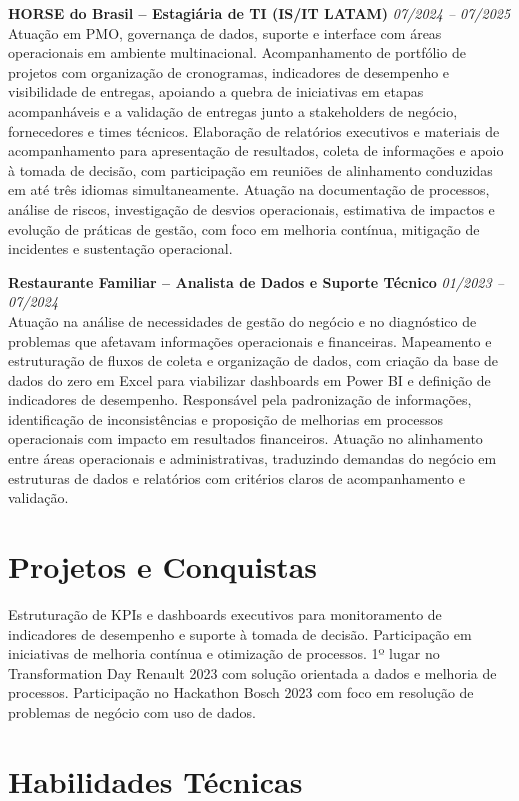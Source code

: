 \documentclass[11pt,a4paper]{article}
\newcommand{\experience}[3]{%
  \textbf{#1} \hfill \textit{#2}\\[4pt]
  #3
  \vspace{8pt}
}
\begin{document}
\experience{HORSE do Brasil -- Estagiária de TI (IS/IT LATAM)}{07/2024 -- 07/2025}{%
Atuação em PMO, governança de dados, suporte e interface com áreas operacionais em ambiente multinacional. Acompanhamento de portfólio de projetos com organização de cronogramas, indicadores de desempenho e visibilidade de entregas, apoiando a quebra de iniciativas em etapas acompanháveis e a validação de entregas junto a stakeholders de negócio, fornecedores e times técnicos. Elaboração de relatórios executivos e materiais de acompanhamento para apresentação de resultados, coleta de informações e apoio à tomada de decisão, com participação em reuniões de alinhamento conduzidas em até três idiomas simultaneamente. Atuação na documentação de processos, análise de riscos, investigação de desvios operacionais, estimativa de impactos e evolução de práticas de gestão, com foco em melhoria contínua, mitigação de incidentes e sustentação operacional.}

\experience{Restaurante Familiar -- Analista de Dados e Suporte Técnico}{01/2023 -- 07/2024}{%
Atuação na análise de necessidades de gestão do negócio e no diagnóstico de problemas que afetavam informações operacionais e financeiras. Mapeamento e estruturação de fluxos de coleta e organização de dados, com criação da base de dados do zero em Excel para viabilizar dashboards em Power BI e definição de indicadores de desempenho. Responsável pela padronização de informações, identificação de inconsistências e proposição de melhorias em processos operacionais com impacto em resultados financeiros. Atuação no alinhamento entre áreas operacionais e administrativas, traduzindo demandas do negócio em estruturas de dados e relatórios com critérios claros de acompanhamento e validação.}

\section*{Projetos e Conquistas}

Estruturação de KPIs e dashboards executivos para monitoramento de indicadores de desempenho e suporte à tomada de decisão. Participação em iniciativas de melhoria contínua e otimização de processos. 1º lugar no Transformation Day Renault 2023 com solução orientada a dados e melhoria de processos. Participação no Hackathon Bosch 2023 com foco em resolução de problemas de negócio com uso de dados.

\section*{Habilidades Técnicas}
\end{document}
